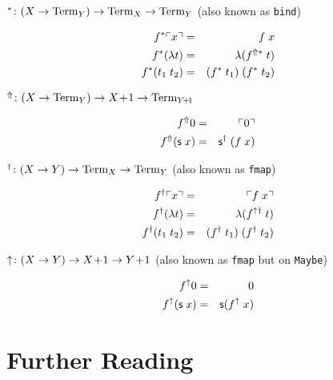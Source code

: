 $^* \colon (X \to \mathrm{Term}_{Y}) \to \mathrm{Term}_{X} \to \mathrm{Term}_{Y}$ (also known as \texttt{bind})

\begin{eqnarray*}
  f^*\ulcorner x \urcorner   & = & f\;x \\
  f^*(\lambda t) & = & \lambda (f^{\Uparrow*} \; t) \\
  f^*(t_1\;t_2)  & = & (f^* \; t_1) \; (f^* \; t_2)
\end{eqnarray*}

$^\Uparrow \colon (X \to \mathrm{Term}_{Y}) \to X\!+\!1 \to \mathrm{Term}_{Y\!+\!1}$

\begin{eqnarray*}
  f^\Uparrow 0 & = & \ulcorner 0 \urcorner \\
  f^\Uparrow (\mathsf{s} \; x) & = & \mathsf{s}^\dagger\;(f\;x) \\
\end{eqnarray*}

$^\dagger \colon (X \to Y) \to \mathrm{Term}_{X} \to \mathrm{Term}_{Y}$ (also known as \texttt{fmap})

\begin{eqnarray*}
  f^\dagger\ulcorner x \urcorner   & = & \ulcorner f\;x \urcorner \\
  f^\dagger(\lambda t) & = & \lambda(f^{\uparrow\dagger}\;t) \\
  f^\dagger(t_1\;t_2)  & = & (f^\dagger\;t_1)\;(f^\dagger\;t_2)
\end{eqnarray*}

$\uparrow \colon (X \to Y) \to X\!+\!1 \to Y\!+\!1$
  (also known as \texttt{fmap} but on \texttt{Maybe})

\begin{eqnarray*}
  f^\uparrow 0            & = & 0 \\
  f^\uparrow (\mathsf{s}\;x) & = & \mathsf{s}(f^\uparrow \; x)
\end{eqnarray*}

\section{Further Reading}
